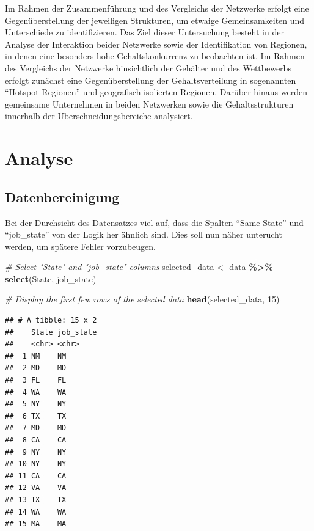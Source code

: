 \documentclass[
]{article}
\newenvironment{Shaded}{\begin{snugshade}}{\end{snugshade}}
\newcommand{\CommentTok}[1]{\textcolor[rgb]{0.56,0.35,0.01}{\textit{#1}}}
\newcommand{\DecValTok}[1]{\textcolor[rgb]{0.00,0.00,0.81}{#1}}
\newcommand{\FunctionTok}[1]{\textcolor[rgb]{0.13,0.29,0.53}{\textbf{#1}}}
\newcommand{\NormalTok}[1]{#1}
\newcommand{\OtherTok}[1]{\textcolor[rgb]{0.56,0.35,0.01}{#1}}
\newcommand{\SpecialCharTok}[1]{\textcolor[rgb]{0.81,0.36,0.00}{\textbf{#1}}}
\begin{document}
Im Rahmen der Zusammenführung und des Vergleichs der Netzwerke erfolgt
eine Gegenüberstellung der jeweiligen Strukturen, um etwaige
Gemeinsamkeiten und Unterschiede zu identifizieren. Das Ziel dieser
Untersuchung besteht in der Analyse der Interaktion beider Netzwerke
sowie der Identifikation von Regionen, in denen eine besonders hohe
Gehaltskonkurrenz zu beobachten ist. Im Rahmen des Vergleichs der
Netzwerke hinsichtlich der Gehälter und des Wettbewerbs erfolgt zunächst
eine Gegenüberstellung der Gehaltsverteilung in sogenannten
``Hotspot-Regionen'' und geografisch isolierten Regionen. Darüber hinaus
werden gemeinsame Unternehmen in beiden Netzwerken sowie die
Gehaltsstrukturen innerhalb der Überschneidungsbereiche analysiert.

\section{Analyse}\label{analyse}

\subsection{Datenbereinigung}\label{datenbereinigung}

Bei der Durchsicht des Datensatzes viel auf, dass die Spalten ``Same
State'' und ``job\_state'' von der Logik her ähnlich sind. Dies soll nun
näher unterucht werden, um spätere Fehler vorzubeugen.

\begin{Shaded}
\begin{Highlighting}[]
\CommentTok{\# Select "State" and "job\_state" columns}
\NormalTok{selected\_data }\OtherTok{\textless{}{-}}\NormalTok{ data }\SpecialCharTok{\%\textgreater{}\%}
  \FunctionTok{select}\NormalTok{(State, job\_state)}

\CommentTok{\# Display the first few rows of the selected data}
\FunctionTok{head}\NormalTok{(selected\_data, }\DecValTok{15}\NormalTok{)}
\end{Highlighting}
\end{Shaded}

\begin{verbatim}
## # A tibble: 15 x 2
##    State job_state
##    <chr> <chr>    
##  1 NM    NM       
##  2 MD    MD       
##  3 FL    FL       
##  4 WA    WA       
##  5 NY    NY       
##  6 TX    TX       
##  7 MD    MD       
##  8 CA    CA       
##  9 NY    NY       
## 10 NY    NY       
## 11 CA    CA       
## 12 VA    VA       
## 13 TX    TX       
## 14 WA    WA       
## 15 MA    MA
\end{verbatim}
\end{document}
